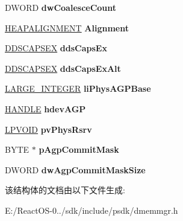 \begin{DoxyCompactItemize}
D\+W\+O\+RD {\bfseries dw\+Coalesce\+Count}
\item 
\mbox{\label{struct___v_m_e_m_h_e_a_p_a30398193868ac2ffd9e52137b1d886e7}} 
\hyperlink{struct___h_e_a_p_a_l_i_g_n_m_e_n_t}{H\+E\+A\+P\+A\+L\+I\+G\+N\+M\+E\+NT} {\bfseries Alignment}
\item 
\mbox{\label{struct___v_m_e_m_h_e_a_p_a071b53673f0add58abb926e25d51b182}} 
\hyperlink{struct___d_d_s_c_a_p_s_e_x}{D\+D\+S\+C\+A\+P\+S\+EX} {\bfseries dds\+Caps\+Ex}
\item 
\mbox{\label{struct___v_m_e_m_h_e_a_p_ac1a8b49fb006069a8e02a94cb6a2b3cb}} 
\hyperlink{struct___d_d_s_c_a_p_s_e_x}{D\+D\+S\+C\+A\+P\+S\+EX} {\bfseries dds\+Caps\+Ex\+Alt}
\item 
\mbox{\label{struct___v_m_e_m_h_e_a_p_a10bfe5b7b7168feaef6b42c7de908ca2}} 
\hyperlink{union___l_a_r_g_e___i_n_t_e_g_e_r}{L\+A\+R\+G\+E\+\_\+\+I\+N\+T\+E\+G\+ER} {\bfseries li\+Phys\+A\+G\+P\+Base}
\item 
\mbox{\label{struct___v_m_e_m_h_e_a_p_ad1851120f3aae023c21dfbbd3bb38587}} 
\hyperlink{interfacevoid}{H\+A\+N\+D\+LE} {\bfseries hdev\+A\+GP}
\item 
\mbox{\label{struct___v_m_e_m_h_e_a_p_abbcb1a3e1d5ef71f5a1c7a1edd692e26}} 
\hyperlink{interfacevoid}{L\+P\+V\+O\+ID} {\bfseries pv\+Phys\+Rsrv}
\item 
\mbox{\label{struct___v_m_e_m_h_e_a_p_a82e9f28db62f446147233fbcab21b0af}} 
B\+Y\+TE $\ast$ {\bfseries p\+Agp\+Commit\+Mask}
\item 
\mbox{\label{struct___v_m_e_m_h_e_a_p_a5cb1294b3f4d5df12d6ec881f207ad07}} 
D\+W\+O\+RD {\bfseries dw\+Agp\+Commit\+Mask\+Size}
\end{DoxyCompactItemize}


该结构体的文档由以下文件生成\+:\begin{DoxyCompactItemize}
\item 
E\+:/\+React\+O\+S-\/0../sdk/include/psdk/dmemmgr.\+h\end{DoxyCompactItemize}
